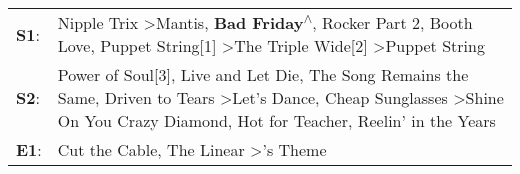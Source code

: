 \begin{supertabular}{p{0.03\textwidth}p{0.92\textwidth}}
 \textbf{S1}:  &                                                                 Nipple Trix\textsuperscript{} \textgreater \enspace Mantis\textsuperscript{}, \enspace \textbf{Bad Friday\textsuperscript{$\wedge$}}, \enspace Rocker Part 2\textsuperscript{}, \enspace Booth Love\textsuperscript{}, \enspace Puppet String[1]\textsuperscript{} \textgreater \enspace The Triple Wide[2]\textsuperscript{} \textgreater \enspace Puppet String\textsuperscript{}  \enspace  \\
 \textbf{S2}:  &  Power of Soul[3]\textsuperscript{}, \enspace Live and Let Die\textsuperscript{}, \enspace The Song Remains the Same\textsuperscript{}, \enspace Driven to Tears\textsuperscript{} \textgreater \enspace Let's Dance\textsuperscript{}, \enspace Cheap Sunglasses\textsuperscript{} \textgreater \enspace Shine On You Crazy Diamond\textsuperscript{}, \enspace Hot for Teacher\textsuperscript{}, \enspace Reelin' in the Years\textsuperscript{}  \enspace  \\
 \textbf{E1}:  &                                                                                                                                                                                                                                                                                                                           Cut the Cable\textsuperscript{}, \enspace The Linear\textsuperscript{} \textgreater {}'s Theme\textsuperscript{}  \enspace  \\
\end{supertabular}
